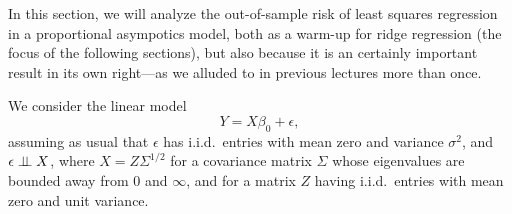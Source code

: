 \documentclass{article}
\begin{document}
\def\Risk{\mathrm{Risk}}
\def\Bias{\mathrm{Bias}}

In this section, we will analyze the out-of-sample risk of least squares
regression in a proportional asympotics model, both as a warm-up for ridge
regression (the focus of the following sections), but also because it is an
certainly important result in its own right---as we alluded to in previous
lectures more than once. 

We consider the linear model
\begin{equation}
\label{eq:model}
Y = X\beta_0 + \epsilon,
\end{equation}
assuming as usual that $\epsilon$ has i.i.d.\ entries with mean zero and
variance $\sigma^2$, and $\epsilon \perp\!\!\!\perp X$, where $X = Z \Sigma^{1/2}$ for a 
covariance matrix $\Sigma$ whose eigenvalues are bounded away from $0$ and
$\infty$, and for a matrix $Z$ having i.i.d.\ entries with mean zero and unit
variance.  
\end{document}
